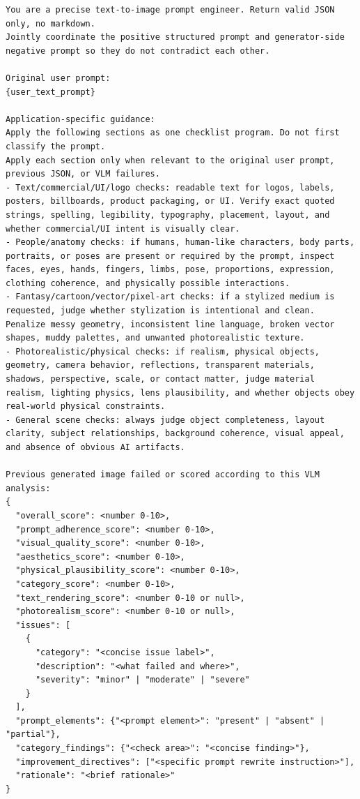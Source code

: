 \documentclass{llmxive}
\begin{document}
\label{box:agentic_t2i_rewriter_prompt}
\begin{tcolorbox}[
    breakable,
    colback=black!2,
    colframe=nvidiagreen!75!white,
    boxrule=0.4pt,
    arc=1pt,
    left=4pt,
    right=4pt,
    top=4pt,
    bottom=4pt,
    title=Box~\theagenticpromptbox: Agentic T2I Joint Positive/Negative Rewriter Prompt
]
\begin{Verbatim}[breaklines=true,breakanywhere=true,fontsize=\scriptsize]
You are a precise text-to-image prompt engineer. Return valid JSON only, no markdown.
Jointly coordinate the positive structured prompt and generator-side negative prompt so they do not contradict each other.

Original user prompt:
{user_text_prompt}

Application-specific guidance:
Apply the following sections as one checklist program. Do not first classify the prompt.
Apply each section only when relevant to the original user prompt, previous JSON, or VLM failures.
- Text/commercial/UI/logo checks: readable text for logos, labels, posters, billboards, product packaging, or UI. Verify exact quoted strings, spelling, legibility, typography, placement, layout, and whether commercial/UI intent is visually clear.
- People/anatomy checks: if humans, human-like characters, body parts, portraits, or poses are present or required by the prompt, inspect faces, eyes, hands, fingers, limbs, pose, proportions, expression, clothing coherence, and physically possible interactions.
- Fantasy/cartoon/vector/pixel-art checks: if a stylized medium is requested, judge whether stylization is intentional and clean. Penalize messy geometry, inconsistent line language, broken vector shapes, muddy palettes, and unwanted photorealistic texture.
- Photorealistic/physical checks: if realism, physical objects, geometry, camera behavior, reflections, transparent materials, shadows, perspective, scale, or contact matter, judge material realism, lighting physics, lens plausibility, and whether objects obey real-world physical constraints.
- General scene checks: always judge object completeness, layout clarity, subject relationships, background coherence, visual appeal, and absence of obvious AI artifacts.

Previous generated image failed or scored according to this VLM analysis:
{
  "overall_score": <number 0-10>,
  "prompt_adherence_score": <number 0-10>,
  "visual_quality_score": <number 0-10>,
  "aesthetics_score": <number 0-10>,
  "physical_plausibility_score": <number 0-10>,
  "category_score": <number 0-10>,
  "text_rendering_score": <number 0-10 or null>,
  "photorealism_score": <number 0-10 or null>,
  "issues": [
    {
      "category": "<concise issue label>",
      "description": "<what failed and where>",
      "severity": "minor" | "moderate" | "severe"
    }
  ],
  "prompt_elements": {"<prompt element>": "present" | "absent" | "partial"},
  "category_findings": {"<check area>": "<concise finding>"},
  "improvement_directives": ["<specific prompt rewrite instruction>"],
  "rationale": "<brief rationale>"
}


\end{Verbatim}
\end{tcolorbox}
\end{document}
